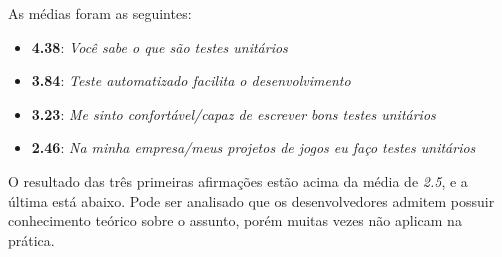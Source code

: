 As médias foram as seguintes:
\begin{itemize}
\item \textbf{4.38}: \textit{Você sabe o que são testes unitários}
\item \textbf{3.84}: \textit{Teste automatizado facilita o desenvolvimento}
\item \textbf{3.23}: \textit{Me sinto confortável/capaz de escrever bons testes unitários}
\item \textbf{2.46}: \textit{Na minha empresa/meus projetos de jogos eu faço testes unitários}
\end{itemize}

O resultado das três primeiras afirmações estão acima da média de \textit{2.5}, e a última está abaixo. Pode ser analisado que os desenvolvedores admitem possuir conhecimento teórico sobre o assunto, porém muitas vezes não aplicam na prática.